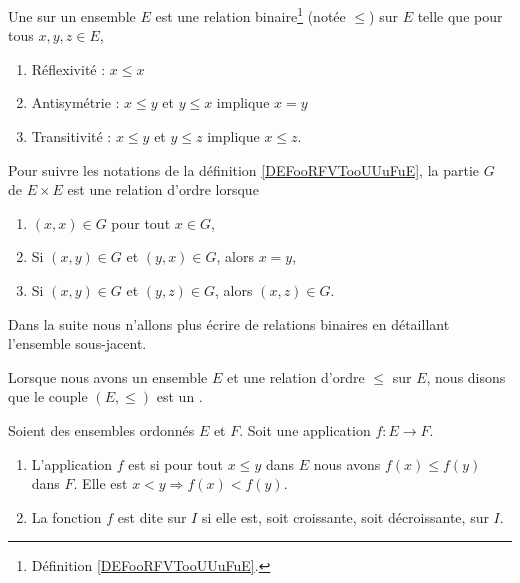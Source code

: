 \begin{definition}      \label{DefooFLYOooRaGYRk}
	Une  sur un ensemble \( E\) est une relation binaire\footnote{Définition \ref{DEFooRFVTooUUuFuE}.} (notée \( \leq\)) sur \( E\) telle que pour tous \( x,y,z\in E\),
	\begin{enumerate}
		\item
		      Réflexivité : \( x\leq x\)
		\item \label{ITEMooQTXOooTZXEnu}
		      Antisymétrie : \( x\leq y\) et \( y\leq x\) implique \( x=y\)
		\item
		      Transitivité : \( x\leq y\) et \( y\leq z\) implique \( x\leq z\).
	\end{enumerate}

	Pour suivre les notations de la définition \ref{DEFooRFVTooUUuFuE}, la partie \( G\) de \( E\times E\) est une relation d'ordre lorsque
	\begin{enumerate}
		\item
		      \( (x,x)\in G\) pour tout \( x\in G\),
		\item
		      Si \( (x,y)\in G\) et \( (y,x)\in G\), alors \( x=y\),
		\item
		      Si \( (x,y)\in G\) et \( (y,z)\in G\), alors \( (x,z)\in G\).
	\end{enumerate}
	Dans la suite nous n'allons plus écrire de relations binaires en détaillant l'ensemble sous-jacent.

	Lorsque nous avons un ensemble \( E\) et une relation d'ordre \( \leq\) sur \( E\), nous disons que le couple \( (E,\leq)\) est un .
\end{definition}


\begin{definition}		\label{DEFooFTZAooLrtNEo}
	Soient des ensembles ordonnés \( E\) et \( F\). Soit une application \(f \colon E\to F  \).
	\begin{enumerate}
		\item
		      L'application \( f\) est  si pour tout \( x\leq y\) dans \( E\) nous avons \( f(x)\leq f(y)\) dans \( F\). Elle est  \( x<y\Rightarrow f(x)<f(y)\).
		\item
		      La fonction \( f\) est dite  sur \( I\) si elle est, soit croissante, soit décroissante, sur \( I\).
	\end{enumerate}
\end{definition}


